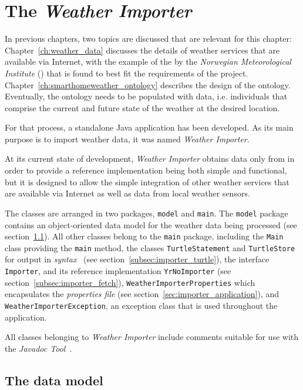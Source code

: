 \chapter{The \emph{Weather Importer}}
\label{ch:weather_importer}

In previous chapters, two topics are discussed that are relevant for this chapter: Chapter~\ref{ch:weather_data} discusses the details of weather services that are available via Internet, with the example of the  by the \emph{Norwegian Meteorological Institute} (\yrno) that is found to best fit the requirements of the \smarthomeweather project. Chapter~\ref{ch:smarthomeweather_ontology} describes the design of the \smarthomeweather ontology. Eventually, the ontology needs to be populated with data, i.e. individuals that comprise the current and future state of the weather at the desired location.

For that process, a standalone Java application has been developed. As its main purpose is to import weather data, it was named \emph{Weather Importer}.

At its current state of development, \emph{Weather Importer} obtains data only from \yrno in order to provide a reference implementation being both simple and functional, but it is designed to allow the simple integration of other weather services that are available via Internet as well as data from local weather sensors.

The classes are arranged in two packages, \texttt{model} and \texttt{main}. The \texttt{model} package contains an object-oriented data model for the weather data being processed (see section~\ref{sec:importer_model}). All other classes belong to the \texttt{main} package, including the \texttt{Main} class providing the \texttt{main} method, the classes \texttt{TurtleStatement} and \texttt{TurtleStore} for output in \emph{ syntax}~\cite{Turtle} (see section~\ref{subsec:importer_turtle}), the interface \texttt{Importer}, and its reference implementation \texttt{YrNoImporter} (see section~\ref{subsec:importer_fetch}), \texttt{WeatherImporterProperties} which encapsulates the \emph{properties file} (see section~\ref{sec:importer_application}), and \texttt{WeatherImporterException}, an exception class that is used throughout the application.

All classes belonging to \emph{Weather Importer} include comments suitable for use with the \emph{Javadoc Tool}~\cite{javadoc}.

\section{The data model}
\label{sec:importer_model}

